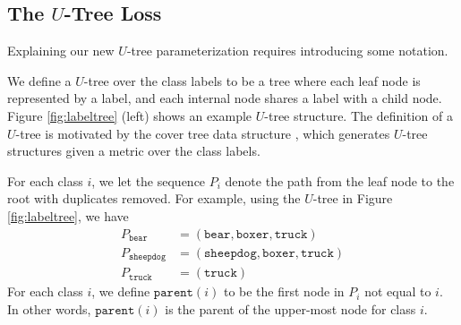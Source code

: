 \documentclass[twoside]{article}
\newcommand{\parent}[1]{\texttt{parent}({#1})}
\begin{document}
\subsection{The $U$-Tree Loss}

Explaining our new $U$-tree parameterization requires introducing some notation.

We define a $U$-tree over the class labels to be a tree where each leaf node is represented by a label,
and each internal node shares a label with a child node.
Figure \ref{fig:labeltree} (left) shows an example $U$-tree structure.
The definition of a $U$-tree is motivated by the cover tree data structure \citep{beygelzimer2006cover,izbicki2015faster},
which generates $U$-tree structures given a metric over the class labels.

For each class $i$, we let the sequence $P_i$ denote the path from the leaf node to the root with duplicates removed.
For example, using the $U$-tree in Figure \ref{fig:labeltree},
we have
\begin{equation*}
\begin{split}
    P_{\texttt{bear}} &= (\texttt{bear}, \texttt{boxer}, \texttt{truck}) \\
    P_{\texttt{sheepdog}} &= (\texttt{sheepdog}, \texttt{boxer}, \texttt{truck}) \\
    P_{\texttt{truck}} &= (\texttt{truck})
\end{split}
\end{equation*}
For each class $i$, we define $\parent{i}$ to be the first node in $P_i$ not equal to $i$.
In other words, $\parent{i}$ is the parent of the upper-most node for class $i$.
\end{document}
